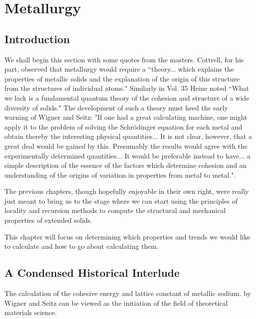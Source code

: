 \chapter{Metallurgy}
\label{chap:metallurgy}
\section{Introduction}
We shall begin this section with some quotes from the masters.
Cottrell, for his part, observed that 
metallurgy would require a ``theory... which explains
the properties of metallic solids and the explanation of the origin of this
structure from the structures of individual atoms." Similarly in Vol. 35
Heine noted ``What we lack is a fundamental quantum theory of the cohesion
and structure of a wide diversity of solids." 
The development of such a theory must heed the early warning of Wigner and Seitz: 
"If one had a great calculating machine, one might 
apply it to the problem of solving the Schr\"odinger equation for each metal
and obtain thereby the interesting physical quantities... It is not clear, however,
that a great deal would be gained by this. Presumably the results would agree
with the experimentally determined quantities... It would be preferable instead
to have... a simple description of the essence of the factors which determine cohesion
and an understanding of the origins of variation in properties from metal to metal."\cite{wigner55}.

The previous chapters, though hopefully enjoyable in their own right, 
were really just meant to bring us to the stage where we can start 
using the principles of locality
and recursion methods to compute the structural and 
mechanical properties of extended solids. 

This chapter will focus on determining which properties and trends we would like
to calculate and how to go about calculating them.

%
\section{A Condensed Historical Interlude}
The calculation of the cohesive energy and lattice constant of 
metallic sodium\cite{wigner34a, wigner33,wigner34b}.
by Wigner and Seitz can be viewed as the initiation of the field
of theoretical materials science.

